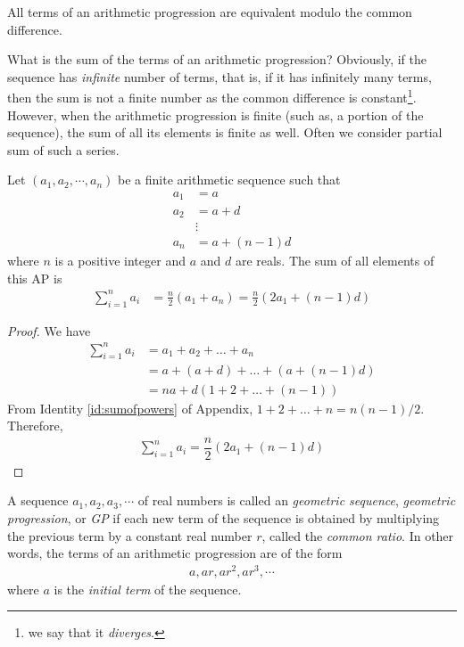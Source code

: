 \documentclass{subfile}
\begin{document}
	\begin{corollary}
		All terms of an arithmetic progression are equivalent modulo the common difference.
	\end{corollary}
What is the sum of the terms of an arithmetic progression? Obviously, if the sequence has \textit{infinite} number of terms, that is, if it has infinitely many terms, then the sum is not a finite number as the common difference is constant\footnote{we say that it \textit{diverges}.}. However, when the arithmetic progression is finite (such as, a portion of the sequence), the sum of all its elements is finite as well. Often we consider partial sum of such a series.
	\begin{theorem}
		Let $(a_1,a_2,\cdots,a_n)$ be a finite arithmetic sequence such that
			\begin{align*}
				a_1 & = a\\
				a_2 & = a+d\\
					& \vdots\\
				a_n & = a+ (n-1)d
			\end{align*}
		where $n$ is a positive integer and $a$ and $d$ are reals. The sum of all elements of this AP is
			\begin{align*}
				\sum_{i=1}^{n} a_i
					& = \frac{n}{2} \left(a_1+a_n\right) = \frac{n}{2} \left(2a_1 + (n-1)d\right)
			\end{align*}
	\end{theorem}

	\begin{proof}
		We have
			\begin{align*}
				\sum_{i=1}^{n} a_i
					&= a_1 + a_2 + \ldots + a_n \\
					&= a + (a+d) + \ldots + \left(a+ (n-1)d\right)\\
					&= na + d\left(1+2+\ldots+ (n-1)\right)
			\end{align*}
		From Identity \ref{id:sumofpowers} of Appendix, $1+2+\ldots+n = n(n-1)/2$. Therefore,
			\begin{align*}
				\sum_{i=1}^{n} a_i = \dfrac{n}{2} \left(2a_1 + (n-1)d\right)
			\end{align*}
	\end{proof}

	\begin{definition}
		A sequence $a_1, a_2, a_3, \cdots$ of real numbers is called an \textit{geometric sequence}, \textit{geometric progression}, or \textit{GP} if each new term of the sequence is obtained by multiplying the previous term by a constant real number $r$, called the \textit{common ratio}. In other words, the terms of an arithmetic progression are of the form
			\begin{align*}
				a, ar, ar^2, ar^3, \cdots
			\end{align*}
		where $a$ is the \textit{initial term} of the sequence.
	\end{definition}
\end{document}
